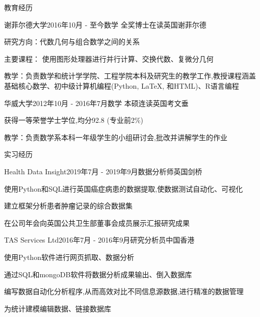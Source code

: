 \documentclass{zhresume} %
\begin{document}

\begin{rSection}{教育经历}

\begin{rSubsection}{谢菲尔德大学}{2016年10月 - 至今}{数学 全奖博士在读}{英国谢菲尔德}
\item 研究方向：代数几何与组合数学之间的关系
\item 主要课程： 使用图形处理器进行并行计算、交换代数、复微分几何
\item 教学：负责数学和统计学学院、工程学院本科及研究生的教学工作,教授课程涵盖基础核心数学、初中级计算机编程(Python, LaTeX, 和HTML)、R语言编程
\end{rSubsection}


\begin{rSubsection}{华威大学}{2012年10月 - 2016年7月}{数学 本硕连读}{英国考文垂}
\item 获得一等荣誉学士学位,均分92.8 (专业前2\%)
\item 教学：负责数学系本科一年级学生的小组研讨会,批改并讲解学生的作业
\end{rSubsection}

\end{rSection}


\begin{rSection}{实习经历}

\begin{rSubsection}{Health Data Insight}{2019年7月 - 2019年9月}{数据分析师}{英国剑桥}
\item 使用Python和SQL进行英国癌症病患的数据提取,使数据测试自动化、可视化
\item 建立框架分析患者肿瘤记录的综合数据集
\item 在公司年会向英国公共卫生部董事会成员展示汇报研究成果
\end{rSubsection}


\begin{rSubsection}{TAS Services Ltd}{2016年7月 - 2016年9月}{研究分析员}{中国香港}
\item 使用Python软件进行网页抓取、数据分析
\item 通过SQL和mongoDB软件将数据分析成果输出、倒入数据库
\item 编写数据自动化分析程序,从而高效对比不同信息源数据,进行精准的数据管理
\item 为统计建模编辑数据、链接数据库
\end{rSubsection}

\end{rSection}
\end{document}
